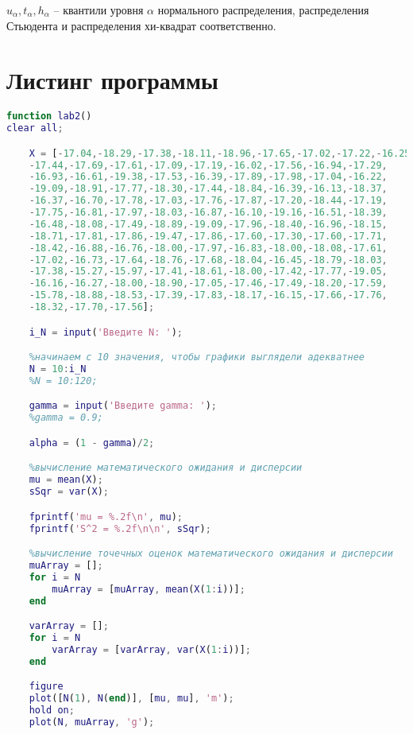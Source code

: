 \newline $u_\alpha,t_\alpha,h_\alpha$ – квантили уровня $\alpha$ нормального распределения, распределения Стьюдента и распределения хи-квадрат соответственно.

\section*{Листинг программы}

\begin{lstlisting}[language=Matlab, caption=Текст программы]
function lab2()
clear all;

	X = [-17.04,-18.29,-17.38,-18.11,-18.96,-17.65,-17.02,-17.22,-16.25,
	-17.44,-17.69,-17.61,-17.09,-17.19,-16.02,-17.56,-16.94,-17.29,
	-16.93,-16.61,-19.38,-17.53,-16.39,-17.89,-17.98,-17.04,-16.22,
	-19.09,-18.91,-17.77,-18.30,-17.44,-18.84,-16.39,-16.13,-18.37,
	-16.37,-16.70,-17.78,-17.03,-17.76,-17.87,-17.20,-18.44,-17.19,
	-17.75,-16.81,-17.97,-18.03,-16.87,-16.10,-19.16,-16.51,-18.39,
	-16.48,-18.08,-17.49,-18.89,-19.09,-17.96,-18.40,-16.96,-18.15,
	-18.71,-17.81,-17.86,-19.47,-17.86,-17.60,-17.30,-17.60,-17.71,
	-18.42,-16.88,-16.76,-18.00,-17.97,-16.83,-18.00,-18.08,-17.61,
	-17.02,-16.73,-17.64,-18.76,-17.68,-18.04,-16.45,-18.79,-18.03,
	-17.38,-15.27,-15.97,-17.41,-18.61,-18.00,-17.42,-17.77,-19.05,
	-16.16,-16.27,-18.00,-18.90,-17.05,-17.46,-17.49,-18.20,-17.59,
	-15.78,-18.88,-18.53,-17.39,-17.83,-18.17,-16.15,-17.66,-17.76,
	-18.32,-17.70,-17.56];

	i_N = input('Введите N: ');

	%начинаем с 10 значения, чтобы графики выглядели адекватнее
	N = 10:i_N
	%N = 10:120;

	gamma = input('Введите gamma: ');
	%gamma = 0.9;

	alpha = (1 - gamma)/2;

	%вычисление математического ожидания и дисперсии
	mu = mean(X);
	sSqr = var(X);

	fprintf('mu = %.2f\n', mu); 
	fprintf('S^2 = %.2f\n\n', sSqr);

	%вычисление точечных оценок математического ожидания и дисперсии
	muArray = [];
	for i = N
		muArray = [muArray, mean(X(1:i))];
	end

	varArray = [];
	for i = N
		varArray = [varArray, var(X(1:i))];
	end

	figure
	plot([N(1), N(end)], [mu, mu], 'm');
	hold on;
	plot(N, muArray, 'g');


\end{lstlisting}
